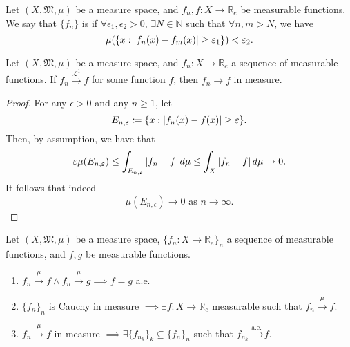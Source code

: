 \documentclass[notoc,notitlepage]{tufte-book}
\newcommand{\convae}{\overset{\text{a.e.}}{\to}}
\newcommand{\convlone}{\overset{\mathcal{L}^1}{\to}}
\newcommand{\convmeas}{\overset{\mu}{\to}}
\begin{document}
\begin{defn}\label{defn:cauchy_in_measure}
  Let $(X, \mathfrak{M}, \mu)$ be a measure space, and
  $f_n, f : X \to \mathbb{R}_e$ be measurable functions.
  We say that $\{ f_n \}$ is 
  if $\forall \epsilon_1, \epsilon_2 > 0$,
  $\exists N \in \mathbb{N}$ such that $\forall n, m > N$,
  we have
  \begin{equation*}
    \mu(\{ x : \left|f_n(x) - f_m(x)\right| \geq \varepsilon_1 \}) < \varepsilon_2.
  \end{equation*}
\end{defn}

\begin{propo}\label{propo:_mathcal_l_1_convergence_implies_convergence_in_measure}
  Let $(X ,\mathfrak{M}, \mu)$ be a measure space, and
  $f_n : X \to \mathbb{R}_e$ a sequence of measurable functions.
  If $f_n \convlone f$ for some function $f$, then $f_n \to f$ in measure.
\end{propo}

\begin{proof}
  For any $\epsilon > 0$ and any $n \geq 1$, let
  \begin{equation*}
    E_{n, \varepsilon} \coloneqq \{ x : \left|f_n(x) - f(x)\right| \geq \varepsilon \}.
  \end{equation*}
  Then, by assumption, we have that
  \begin{equation*}
    \varepsilon \mu(E_{n, \varepsilon})
    \leq \int_{E_{n, \varepsilon}} \left|f_n - f\right| \mathop{}\!d{\mu}
    \leq \int_{X} \left|f_n - f\right| \mathop{}\!d{\mu} \to 0.
  \end{equation*}
  It follows that indeed
  \begin{equation*}
    \mu(E_{n, \epsilon}) \to 0 \text{ as } n \to \infty.
  \end{equation*}
\end{proof}

\begin{thm}\label{thm:various_results_related_to_convergence_in_measure}
  Let $(X, \mathfrak{M}, \mu)$ be a measure space,
  $\{ f_n : X \to \mathbb{R}_e \}_n$ a sequence of measurable functions,
  and $f, g$ be measurable functions.
  \begin{enumerate}
    \item $f_n \convmeas f \land f_n \convmeas g \implies f = g$ a.e.
    \item $\{ f_n \}_n$ is Cauchy in measure
      $\implies \exists f : X \to \mathbb{R}_e$ measurable such that
      $f_n \convmeas f$.
    \item $f_n \convmeas f$ in measure
      $\implies \exists \{ f_{n_k} \}_{k} \subseteq \{ f_n \}_n$ such that
      $f_{n_k} \convae f$.
  \end{enumerate}
\end{thm}
\end{document}
